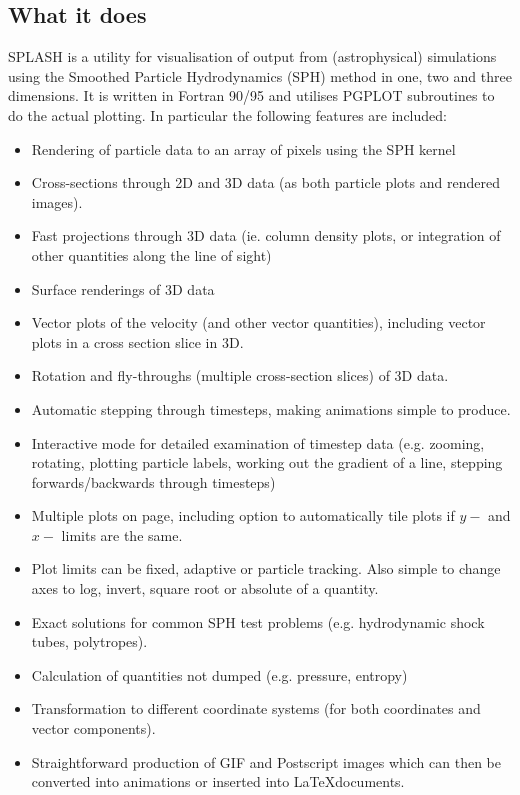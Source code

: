 \documentclass[a4paper,11pt]{article}
\begin{document}
\subsection{What it does}
SPLASH is a utility for visualisation of output from (astrophysical) simulations using the
Smoothed Particle Hydrodynamics (SPH) method in one, two and three dimensions.
It is written in Fortran 90/95 and
utilises PGPLOT subroutines to do the actual plotting. In particular the following
features are included:
\begin{itemize}
\item Rendering of particle data to an array of pixels using the SPH kernel
\item Cross-sections through 2D and 3D data (as both particle plots and rendered
images).
\item Fast projections through 3D data (ie. column density plots, or integration of
other quantities along the line of sight)
\item Surface renderings of 3D data
\item Vector plots of the velocity (and other vector quantities), including vector
plots in a cross section slice in 3D.
\item Rotation and fly-throughs (multiple cross-section slices) of 3D data.
\item Automatic stepping through timesteps, making animations simple to produce.
\item Interactive mode for detailed examination of timestep data (e.g. zooming,
rotating, plotting particle labels, working out the gradient of a line, stepping forwards/backwards
through timesteps)
\item Multiple plots on page, including option to automatically tile plots if $y-$ and $x-$ limits
are the same.
\item Plot limits can be fixed, adaptive or particle tracking. Also simple to change
axes to log, invert, square root or absolute of a quantity.
\item Exact solutions for common SPH test problems (e.g. hydrodynamic shock tubes,
polytropes).
\item Calculation of quantities not dumped (e.g. pressure, entropy)
\item Transformation to different coordinate systems (for both coordinates and
vector components).
\item Straightforward production of GIF and Postscript images which can then be
converted into animations or inserted into \LaTeX documents.
\end{itemize}
\end{document}
